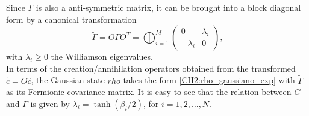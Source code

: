 Since $\Gamma$ is also a anti-symmetric matrix, it can be brought into a block diagonal form by a canonical transformation
\begin{equation}
\tilde{\Gamma} = O \Gamma O^{T}=\bigoplus_{i=1}^{M}\left(\begin{array}{cc}
0 & \lambda_{i} \\
-\lambda_{i} & 0
\end{array}\right),
\label{CH2:Williamson_Cov_fermionic_matrix}
\end{equation}
with $\lambda_i\geq 0$ the Williamson eigenvalues.\\
In terms of the creation/annihilation operators obtained from the transformed $\tilde{c}=O\hat{c}$, the Gaussian state $rho$ takes the form \eqref{CH2:rho_gaussiano_exp} with $\tilde{\Gamma}$ as its Fermionic covariance matrix. It is easy to see that the relation between $G$ and $\Gamma$ is given by $\lambda_{i} = \tanh{\left(\beta_{i}/2\right)}$, for $i=1,2,\ldots,N$\cite{kraus_pairing_2009}.







